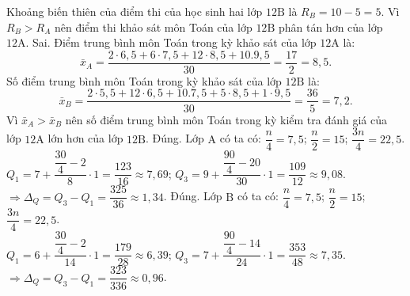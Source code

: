\begin{ex}
{\begin{itemchoice}
			Khoảng biến thiên của điểm thi của học sinh hai lớp $12\mathrm{B}$ là $R_B=10-5=5$.
			Vì $R_B>R_A$ nên điểm thi khảo sát môn Toán của lớp $12\mathrm{B}$ phân tán hơn của lớp $12\mathrm{A}$.
			\itemch Sai. Điểm trung bình môn Toán trong kỳ khảo sát của lớp $12\mathrm{A}$ là:
			$$
			\bar{x}_A=\dfrac{2 \cdot 6{,}5+6 \cdot 7{,}5+12 \cdot 8{,}5+10.9{,}5}{30}=\dfrac{17}{2}=8{,}5.
			$$
			Số điểm trung bình môn Toán trong kỳ khảo sát của lớp $12\mathrm{B}$ là:
			$$
			\bar{x}_B=\dfrac{2 \cdot 5{,}5+12 \cdot 6{,}5+10.7{,}5+5 \cdot 8{,}5+1 \cdot 9{,}5}{30}=\dfrac{36}{5}=7{,}2.
			$$
			Vì $\bar{x}_A>\bar{x}_B$ nên số điểm trung bình môn Toán trong kỳ kiểm tra đánh giá của lớp $12\mathrm{A}$ lớn hơn của lớp $12\mathrm{B}$.
			\itemch Đúng. Lớp $\mathrm{A}$ có ta có: 
			$\dfrac{n}{4}=7{,}5$; $\dfrac{n}{2}=15$; $\dfrac{3n}{4}=22{,}5$.\\
			$Q_1=7+\dfrac{\dfrac{30}{4}-2}{8} \cdot 1=\dfrac{123}{16} \approx 7{,}69$; $Q_3=9+\dfrac{\dfrac{90}{4}-20}{30} \cdot 1=\dfrac{109}{12} \approx 9{,}08$.\\
			$\Rightarrow \Delta_Q=Q_3-Q_1=\dfrac{325}{36} \approx 1{,}34$.
			\itemch Đúng. Lớp $\mathrm{B}$ có ta có: $\dfrac{n}{4}=7{,}5$; $\dfrac{n}{2}=15$; $\dfrac{3 n}{4}=22{,}5$.\\
			$Q_1=6+\dfrac{\dfrac{30}{4}-2}{14} \cdot 1=\dfrac{179}{28} \approx 6{,}39$; $Q_3=7+\dfrac{\dfrac{90}{4}-14}{24} \cdot 1=\dfrac{353}{48} \approx 7{,}35$.\\ 
			$\Rightarrow \Delta_Q=Q_3-Q_1=\dfrac{323}{336} \approx 0{,}96$.
		\end{itemchoice}
	}
\end{ex}

